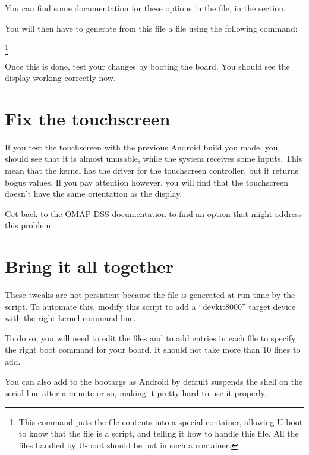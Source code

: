 You can find some documentation for these options in the
 file, in the  section.

You will then have to generate from this  file a  file
using the following command:

\footnote{This command puts the  file contents into a special container,
allowing U-boot to know that the  file is a script, and telling it how to handle
this file. All the files handled by U-boot should be put in such a container.}
 
Once this is done, test your changes by booting the board. You should see the
display working correctly now.

\section{Fix the touchscreen}

If you test the touchscreen with the previous Android build you made, you should
see that it is almost unusable, while the system receives some inputs. This mean
that the kernel has the driver for the touchscreen controller, but it returns
bogus values. If you pay attention however, you will find that the touchscreen
doesn't have the same orientation as the display.

Get back to the OMAP DSS documentation to find an option that might address
this problem.

\section{Bring it all together}

These tweaks are not persistent because the  file is generated at run
time by the  script. To automate this, modify this
script to add a ``devkit8000'' target device with the right kernel command line.

To do so, you will need to edit the files
 and
 to add  entries in each
file to specify the right boot command for your board. It should not take more than 10 lines to
add.

You can also add  to the bootargs as Android by
default suspends the shell on the serial line after a minute or so, making it pretty
hard to use it properly.

